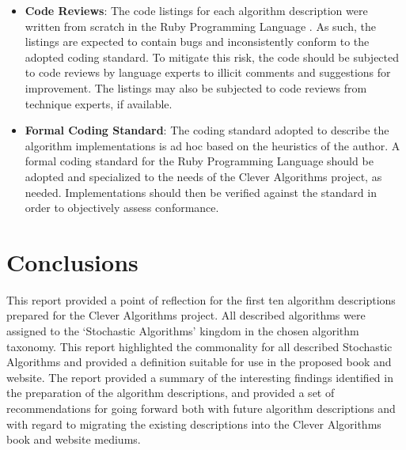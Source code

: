 \documentclass[a4paper, 11pt]{article}
\begin{document}
\begin{itemize}
	\item \textbf{Code Reviews}: The code listings for each algorithm description were written from scratch in the Ruby Programming Language \cite{Brownlee2010o}. As such, the listings are expected to contain bugs and inconsistently conform to the adopted coding standard. To mitigate this risk, the code should be subjected to code reviews by language experts to illicit comments and suggestions for improvement. The listings may also be subjected to code reviews from technique experts, if available.
	\item \textbf{Formal Coding Standard}: The coding standard adopted to describe the algorithm implementations is ad hoc based on the heuristics of the author. A formal coding standard for the Ruby Programming Language should be adopted and specialized to the needs of the Clever Algorithms project, as needed. Implementations should then be verified against the standard in order to objectively assess conformance.  
\end{itemize}

% 
% 
\section{Conclusions}
\label{sec:conclusions}
This report provided a point of reflection for the first ten algorithm descriptions prepared for the Clever Algorithms project. All described algorithms were assigned to the `Stochastic Algorithms' kingdom in the chosen algorithm taxonomy. This report highlighted the commonality for all described Stochastic Algorithms and provided a definition suitable for use in the proposed book and website.
The report provided a summary of the interesting findings identified in the preparation of the algorithm descriptions, and provided a set of recommendations for going forward both with future algorithm descriptions and with regard to migrating the existing descriptions into the Clever Algorithms book and website mediums.



\end{document}
